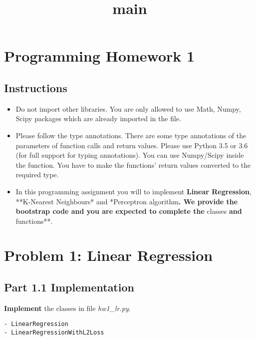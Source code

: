 \documentclass[11pt]{article}
\title{main}
\providecommand{\tightlist}{%
      \setlength{\itemsep}{0pt}\setlength{\parskip}{0pt}}
\begin{document}
    
    
    \maketitle
    
    

    
    \section{Programming Homework 1}\label{programming-homework-1}

\subsection{Instructions}\label{instructions}

\begin{itemize}
\tightlist
\item
  Do not import other libraries. You are only allowed to use Math,
  Numpy, Scipy packages which are already imported in the file.
\item
  Please follow the type annotations. There are some type annotations of
  the parameters of function calls and return values. Please use Python
  3.5 or 3.6 (for full support for typing annotations). You can use
  Numpy/Scipy inside the function. You have to make the functions'
  return values converted to the required type.
\item
  In this programming assignment you will to implement \textbf{Linear
  Regression}, **K-Nearest Neighbours* and *Perceptron
  algorithm\textbf{. We provide the bootstrap code and you are expected
  to complete the }classes\textbf{ and }functions**.
\end{itemize}

    \section{Problem 1: Linear
Regression}\label{problem-1-linear-regression}

    \subsection{Part 1.1 Implementation}\label{part-1.1-implementation}

    \textbf{Implement} the classes in file \emph{hw1\_lr.py}.

\begin{verbatim}
- LinearRegression
- LinearRegressionWithL2Loss
\end{verbatim}
\end{document}
